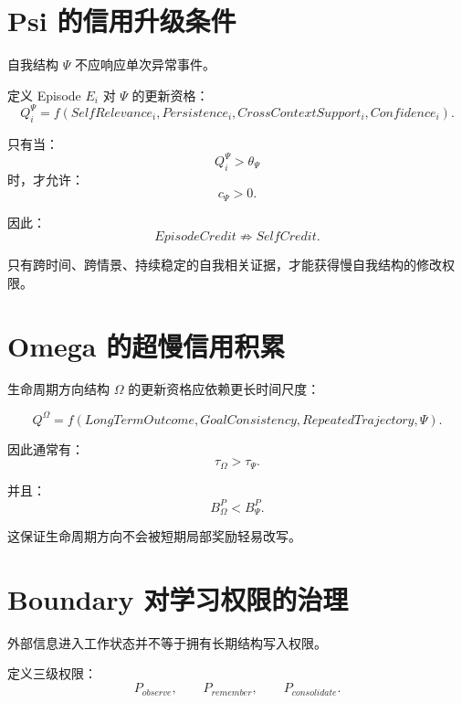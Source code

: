 \section{Psi 的信用升级条件}

自我结构 $\Psi$ 不应响应单次异常事件。

定义 Episode $E_i$ 对 $\Psi$ 的更新资格：
\begin{equation}
Q_i^\Psi
=
f(
SelfRelevance_i,
Persistence_i,
CrossContextSupport_i,
Confidence_i
).
\end{equation}

只有当：
\begin{equation}
Q_i^\Psi
>
\theta_\Psi
\end{equation}
时，才允许：
\begin{equation}
c_\Psi>0.
\end{equation}

因此：
\begin{equation}
\boxed{
EpisodeCredit
\not\Rightarrow
SelfCredit.
}
\end{equation}

只有跨时间、跨情景、持续稳定的自我相关证据，才能获得慢自我结构的修改权限。


\section{Omega 的超慢信用积累}

生命周期方向结构 $\Omega$ 的更新资格应依赖更长时间尺度：

\begin{equation}
Q^\Omega
=
f(
LongTermOutcome,
GoalConsistency,
RepeatedTrajectory,
\Psi
).
\end{equation}

因此通常有：
\begin{equation}
\tau_\Omega
>
\tau_\Psi.
\end{equation}

并且：
\begin{equation}
B_\Omega^P
<
B_\Psi^P.
\end{equation}

这保证生命周期方向不会被短期局部奖励轻易改写。


\section{Boundary 对学习权限的治理}

外部信息进入工作状态并不等于拥有长期结构写入权限。

定义三级权限：
\begin{equation}
P_{observe},
\qquad
P_{remember},
\qquad
P_{consolidate}.
\end{equation}

